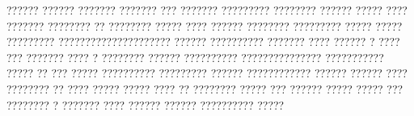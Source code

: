 ?????? ?????? ??????? ??????? ??? ??????? ????????? ???????? ?????? ????? ???? ??????? ???????? ?? ???????? ????? ???? ?????? ???????? ????????? ????? ????? ????????? ????????????????????? ?????? ?????????? ??????? ???? ?????? ? ???? ??? ??????? ???? ? ????????  ?????? ?????????? ??????????????? ??????????? ????? ?? ??? ????? ?????????? ????????? ?????? ???????????? ?????? ?????? ???? ???????? ?? ???? ????? ????? ???? ?? ???????? ????? ??? ?????? ????? ?????  ??? ???????? ? ??????? ???? ?????? ??????  ?????????? ?????